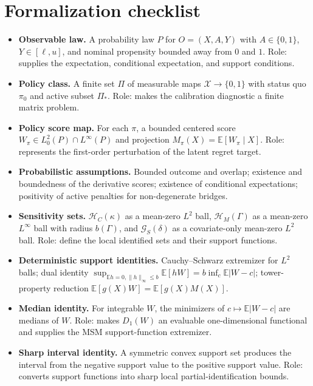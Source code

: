 \documentclass[11pt]{article}
\newcommand{\E}{\mathbb{E}}
\theoremstyle{definition}
\theoremstyle{plain}
\theoremstyle{remark}
\begin{document}
\section{Formalization checklist}
\begin{itemize}[leftmargin=*]
\item \textbf{Observable law.}  A probability law $P$ for $O=(X,A,Y)$ with
$A\in\{0,1\}$, $Y\in[\ell,u]$, and nominal propensity bounded away from $0$ and $1$.
Role: supplies the expectation, conditional expectation, and support conditions.

\item \textbf{Policy class.}  A finite set $\Pi$ of measurable maps
$\mathcal X\to\{0,1\}$ with status quo $\pi_0$ and active subset $\Pi_\ast$.
Role: makes the calibration diagnostic a finite matrix problem.

\item \textbf{Policy score map.}  For each $\pi$, a bounded centered score
$W_\pi\in L^2_0(P)\cap L^\infty(P)$ and projection $M_\pi(X)=\E[W_\pi\mid X]$.
Role: represents the first-order perturbation of the latent regret target.

\item \textbf{Probabilistic assumptions.}  Bounded outcome and overlap; existence and
boundedness of the derivative scores; existence of conditional expectations; positivity
of active penalties for non-degenerate bridges.

\item \textbf{Sensitivity sets.}  $\mathcal H_C(\kappa)$ as a mean-zero $L^2$ ball,
$\mathcal H_M(\Gamma)$ as a mean-zero $L^\infty$ ball with radius $b(\Gamma)$, and
$\mathcal G_S(\delta)$ as a covariate-only mean-zero $L^2$ ball.  Role: define the
local identified sets and their support functions.

\item \textbf{Deterministic support identities.}  Cauchy--Schwarz extremizer for
$L^2$ balls; dual identity
$\sup_{\E h=0,\|h\|_\infty\le b}\E[hW]=b\inf_c\E|W-c|$; tower-property reduction
$\E[g(X)W]=\E[g(X)M(X)]$.

\item \textbf{Median identity.}  For integrable $W$, the minimizers of
$c\mapsto\E|W-c|$ are medians of $W$.  Role: makes $D_1(W)$ an evaluable
one-dimensional functional and supplies the MSM support-function extremizer.

\item \textbf{Sharp interval identity.}  A symmetric convex support set produces the
interval from the negative support value to the positive support value.  Role: converts
support functions into sharp local partial-identification bounds.


\end{itemize}
\end{document}
